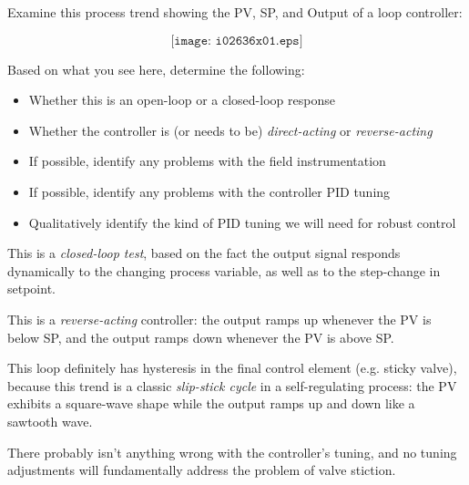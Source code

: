 

Examine this process trend showing the PV, SP, and Output of a loop controller:

$$\texttt{[image: i02636x01.eps]}$$

Based on what you see here, determine the following:

\begin{itemize}
\item{} Whether this is an open-loop or a closed-loop response
\item{} Whether the controller is (or needs to be) {\it direct-acting} or {\it reverse-acting}
\item{} If possible, identify any problems with the field instrumentation
\item{} If possible, identify any problems with the controller PID tuning
\item{} Qualitatively identify the kind of PID tuning we will need for robust control
\end{itemize}







This is a {\it closed-loop test}, based on the fact the output signal responds dynamically to the changing process variable, as well as to the step-change in setpoint.

\vskip 10pt

This is a {\it reverse-acting} controller: the output ramps up whenever the PV is below SP, and the output ramps down whenever the PV is above SP.

\vskip 10pt

This loop definitely has hysteresis in the final control element (e.g. sticky valve), because this trend is a classic {\it slip-stick cycle} in a self-regulating process: the PV exhibits a square-wave shape while the output ramps up and down like a sawtooth wave.

\vskip 10pt

There probably isn't anything wrong with the controller's tuning, and no tuning adjustments will fundamentally address the problem of valve stiction.  

\vskip 10pt

